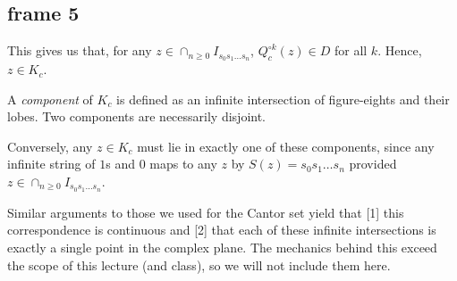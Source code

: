 \documentclass[xcolor=x11names,compress]{beamer}
\renewcommand{\(}{\begin{columns}}
\renewcommand{\)}{\end{columns}}
\newcommand{\<}[1]{\begin{column}{#1}}
\renewcommand{\>}{\end{column}}
\begin{document}
\subsection{frame 5}
\begin{frame}

This gives us that, for any $z \in \cap_{n\ge 0} I_{s_0s_1\ldots s_n}$, $Q_c^{\circ k} (z) \in D$ for all $k$. Hence, $z \in K_c$.

\vspace{0.4cm}
\pause

A \textsl{component} of $K_c$ is defined as an infinite intersection of figure-eights and their lobes. Two components are necessarily disjoint.

\vspace{0.4cm}
\pause

Conversely, any $z \in K_c$ must lie in exactly one of these components, since any infinite string of $1$s and $0$
maps to any $z$ by $S(z) = s_0s_1\ldots s_n$ provided $z\in \cap_{n\ge 0} I_{s_0s_1 \ldots s_n}$.

\vspace{0.4cm}
\pause

Similar arguments to those we used for the Cantor set yield that [1] this correspondence is continuous and [2] that each of these infinite intersections is exactly a single point in the complex plane. The mechanics behind this exceed the scope of this lecture (and class), so we will not include them here.



\end{frame}




\end{document}
